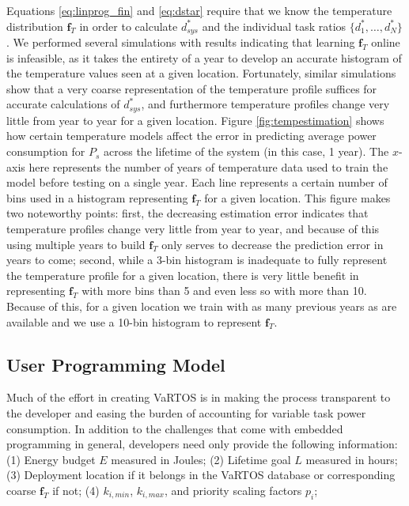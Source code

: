 Equations \ref{eq:linprog_fin} and \ref{eq:dstar} require that we know the temperature distribution $\pmb{f}_T$ in order to calculate $d_{sys}^*$ and the individual task ratios $\{d_1^*,\ldots,d_N^*\}$. We performed several simulations with results indicating that learning $\pmb{f}_T$ online is infeasible, as it takes the entirety of a year to develop an accurate histogram of the temperature values seen at a given location.  Fortunately, similar simulations show that a very coarse representation of the temperature profile suffices for accurate calculations of $d_{sys}^*$, and furthermore temperature profiles change very little from year to year for a given location. Figure \ref{fig:tempestimation} shows how certain temperature models affect the error in predicting average power consumption for $P_s$ across the lifetime of the system (in this case, 1 year).  The $x$-axis here represents the number of years of temperature data used to train the model before testing on a single year.  Each line represents a certain number of bins used in a histogram representing $\pmb{f}_T$ for a given location. This figure makes two noteworthy points: first, the decreasing estimation error indicates that temperature profiles change very little from year to year, and because of this using multiple years to build $\pmb{f}_T$ only serves to decrease the prediction error in years to come; second, while a 3-bin histogram is inadequate to fully represent the temperature profile for a given location, there is very little benefit in representing $\pmb{f}_T$ with more bins than 5 and even less so with more than 10.  Because of this, for a given location we train with as many previous years as are available and we use a 10-bin histogram to represent $\pmb{f}_T$.  


\subsection{User Programming Model}
\label{sec:vartos:tool}
Much of the effort in creating VaRTOS is in making the process transparent to the developer and easing the burden of accounting for variable task power consumption.  In addition to the challenges that come with embedded programming in general, developers need only provide the following information:
(1) Energy budget $E$ measured in Joules;
(2) Lifetime goal $L$ measured in hours;
(3) Deployment location if it belongs in the VaRTOS database or corresponding coarse $\pmb{f}_T$ if not;
(4) $k_{i,min}$, $k_{i,max}$, and priority scaling factors $p_i$;

